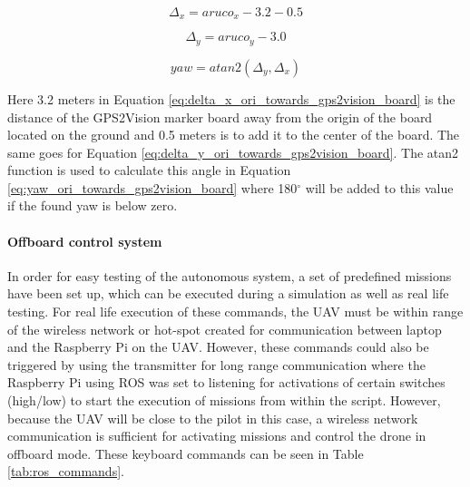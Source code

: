 \documentclass[../Head/report.tex]{subfiles}
\begin{document}
\begin{equation}
	\Delta_x = aruco_x - 3.2 - 0.5
	\label{eq:delta_x_ori_towards_gps2vision_board}
\end{equation}

\begin{equation}
	\Delta_y = aruco_y - 3.0
	\label{eq:delta_y_ori_towards_gps2vision_board}
\end{equation}

\begin{equation}
	yaw = atan2(\Delta_y, \Delta_x)
	\label{eq:yaw_ori_towards_gps2vision_board}
\end{equation}

Here 3.2 meters in Equation \ref{eq:delta_x_ori_towards_gps2vision_board} is the distance of the GPS2Vision marker board away from the origin of the board located on the ground and 0.5 meters is to add it to the center of the board. The same goes for Equation \ref{eq:delta_y_ori_towards_gps2vision_board}. The atan2 function is used to calculate this angle in Equation \ref{eq:yaw_ori_towards_gps2vision_board} where 180$^{\circ}$ will be added to this value if the found yaw is below zero. 


\paragraph{Offboard control system}
\label{sec:offboard_control_system}

In order for easy testing of the autonomous system, a set of predefined missions have been set up, which can be executed during a simulation as well as real life testing. For real life execution of these commands, the UAV must be within range of the wireless network or hot-spot created for communication between laptop and the Raspberry Pi on the UAV. However, these commands could also be triggered by using the transmitter for long range communication where the Raspberry Pi using ROS was set to listening for activations of certain switches (high/low) to start the execution of missions from within the script. However, because the UAV will be close to the pilot in this case, a wireless network communication is sufficient for activating missions and control the drone in offboard mode. These keyboard commands can be seen in Table \ref{tab:ros_commands}.  
\end{document}
